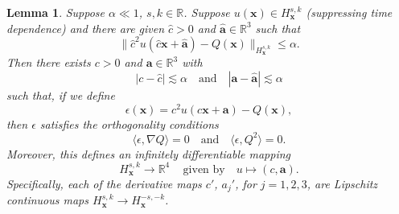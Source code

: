 \documentclass[12pt,letterpaper]{amsart}
\newcommand{\la}{\langle}
\newcommand{\ra}{\rangle}
\newtheorem{lemma}[theorem]{Lemma}
\theoremstyle{remark}
\numberwithin{equation}{section}
\numberwithin{theorem}{section}
\numberwithin{table}{section}
\begin{document}
\begin{lemma}
\label{L:implicit1}
Suppose $\alpha \ll 1$, $s, k \in \mathbb{R}$.  Suppose $u(\mathbf{x})\in H_{\mathbf{x}}^{s,k}$ (suppressing time dependence)  and there are given $\hat c>0$ and $\hat{\mathbf{a}}\in \mathbb{R}^3$ such that 
$$
\|\hat c^2 u(\hat c \mathbf{x}+\hat{\mathbf{a}}) - Q(\mathbf{x}) \|_{H_{\mathbf{x}}^{s,k}} \leq \alpha.
$$
Then there exists $c>0$ and $\mathbf{a}\in \mathbb{R}^3$ with
$$
|c-\hat c | \lesssim \alpha \quad \mbox{and} \quad |\mathbf{a} - \hat{\mathbf{a}}|  \lesssim \alpha
$$
such that, if we define
$$
\epsilon(\mathbf{x}) = c^2 u(c\mathbf{x}+\mathbf{a}) - Q(\mathbf{x}),
$$
then $\epsilon$ satisfies the orthogonality conditions
$$
\la \epsilon, \nabla Q \ra =0 \quad \mbox{and} \quad \la \epsilon, Q^2 \ra =0.
$$
Moreover, this defines an infinitely differentiable mapping
$$
H_{\mathbf{x}}^{s,k} \to \mathbb{R}^4\, \quad \text{given by} \quad u \mapsto (c, \mathbf{a}).
$$
Specifically, each of the derivative maps $c'$, $a_j'$, for $j=1,2,3$, are Lipschitz continuous maps $H_{\mathbf{x}}^{s,k} \to H_{\mathbf{x}}^{-s,-k}$.  
\end{lemma}
\end{document}
